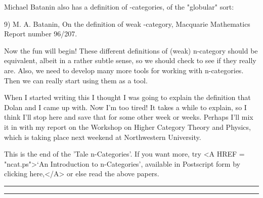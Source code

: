 Michael Batanin also has a definition of \omega -categories, of
the "globular" sort:

9) M. A. Batanin, On the definition of weak \omega -category, Macquarie
Mathematics Report number 96/207.

Now the fun will begin!  These different definitions of (weak) n-category
should be equivalent, albeit in a rather subtle sense, so we should check
to see if they really are.  Also, we need to develop many more tools for
working with n-categories.  Then we can really start using them as a tool.

When I started writing this I thought I was going to explain the
definition that Dolan and I came up with.  Now I'm too tired!  It
takes a while to explain, so I think I'll stop here and save that for
some other week or weeks.  Perhaps I'll mix it in with my report on
the Workshop on Higher Category Theory and Physics, which is taking
place next weekend at Northwestern University.



This is the end of the 'Tale n-Categories'.  If you want more, try
<A HREF = "ncat.ps">`An Introduction to n-Categories', available in 
Postscript form by clicking here,</A> or else read the above
papers. 


\par\noindent\rule{\textwidth}{0.4pt}

\par\noindent\rule{\textwidth}{0.4pt}

